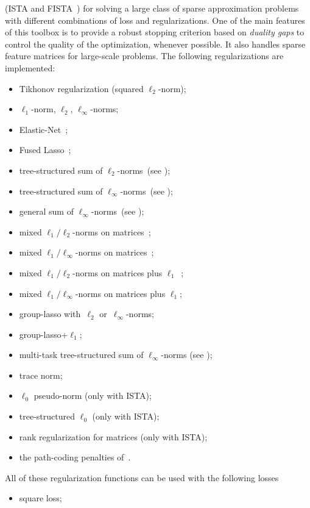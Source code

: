 \documentclass[a4paper, 11pt]{article}
\begin{document}
\begin{itemize}
(ISTA and FISTA~\cite{beck}) for solving a large class of sparse approximation
problems with different combinations of loss and regularizations. One of the main
features of this toolbox is to provide a robust stopping criterion based on
\emph{duality gaps} to control the quality of the optimization, whenever
possible. It also handles sparse feature matrices for large-scale problems. The following regularizations are implemented:
\begin{itemize}
\item Tikhonov regularization (squared $\ell_2$-norm);
\item $\ell_1$-norm, $\ell_2$, $\ell_\infty$-norms;
\item Elastic-Net~\cite{zou};
\item Fused Lasso~\cite{tibshirani2};
\item tree-structured sum of $\ell_2$-norms~(see \cite{jenatton3,jenatton4});
\item tree-structured sum of $\ell_\infty$-norms~(see \cite{jenatton3,jenatton4});
\item general sum of $\ell_\infty$-norms~(see \cite{mairal10,mairal13});
\item mixed $\ell_1/\ell_2$-norms on matrices~\cite{yuan,obozinski};
\item mixed $\ell_1/\ell_\infty$-norms on matrices~\cite{yuan,obozinski};
\item mixed $\ell_1/\ell_2$-norms on matrices plus $\ell_1$~\cite{sprechmann,Friedman2010};
\item mixed $\ell_1/\ell_\infty$-norms on matrices plus $\ell_1$;
\item group-lasso with~$\ell_2$ or~$\ell_\infty$-norms;
\item group-lasso+$\ell_1$;
\item multi-task tree-structured sum of $\ell_\infty$-norms (see \cite{mairal10,mairal13});
\item trace norm;
\item $\ell_0$ pseudo-norm (only with ISTA);
\item tree-structured $\ell_0$ (only with ISTA);
\item rank regularization for matrices (only with ISTA);
\item the path-coding penalties of~\cite{mairal14}.
\end{itemize}
All of these regularization functions can be used with the following losses
\begin{itemize}
\item square loss;

\end{itemize}
\end{itemize}
\end{document}
